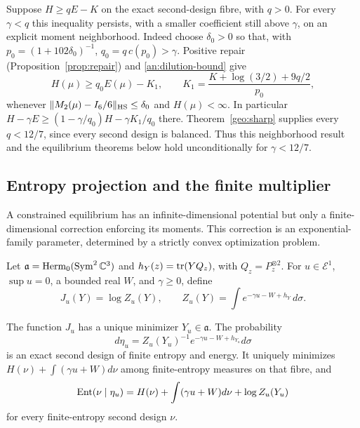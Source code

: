 Suppose $H\ge qE-K$ on the exact second-design fibre, with $q>0$.
For every $\gamma<q$ this inequality persists, with a smaller coefficient
still above $\gamma$, on an explicit moment neighborhood. Indeed choose
$\delta_0>0$ so that, with $p_0=(1+102\delta_0)^{-1}$,
$q_0=q\,c(p_0)>\gamma$. Positive repair
(Proposition~\ref{prop:repair}) and \eqref{an:dilution-bound} give
\begin{equation}
 H(\mu)\ge q_0E(\mu)-K_1,
 \qquad
 K_1=\frac{K+\log(3/2)+9q/2}{p_0},
 \label{an:robust-coercivity}
\end{equation}
whenever $\|M_2(\mu)-I_6/6\|_{\rm HS}\le\delta_0$ and $H(\mu)<\infty$.
In particular $H-\gamma E\ge(1-\gamma/q_0)H-\gamma K_1/q_0$ there.
Theorem~\ref{geo:sharp} supplies every $q<12/7$, since every second
design is balanced. Thus this neighborhood result and the equilibrium
theorems below hold unconditionally for $\gamma<12/7$.

\subsection{Entropy projection and the finite multiplier}

A constrained equilibrium has an infinite-dimensional potential but only
a finite-dimensional correction enforcing its moments. This correction
is an exponential-family parameter, determined by a strictly convex
optimization problem.

Let $\mathfrak a=\operatorname{Herm}_0(\operatorname{Sym}^2\mathbb C^3)$ and
$h_Y(z)=\operatorname{tr}(YQ_z)$, with $Q_z=P_z^{\otimes2}$. For
$u\in\mathcal E^1$, $\sup u=0$, a bounded real $W$, and $\gamma\ge0$,
define
\[
 J_u(Y)=\log Z_u(Y),\qquad
 Z_u(Y)=\int e^{-\gamma u-W+h_Y}\,d\sigma.
\]

\begin{theorem}
\label{an:entropy-projection}
The function $J_u$ has a unique minimizer $Y_u\in\mathfrak a$.
The probability
\begin{equation}
 d\eta_u=Z_u(Y_u)^{-1}e^{-\gamma u-W+h_{Y_u}}d\sigma
 \label{an:exponential-family}
\end{equation}
is an exact second design of finite entropy and energy. It uniquely
minimizes $H(\nu)+\int(\gamma u+W)d\nu$ among finite-entropy measures
on that fibre, and
\begin{equation}
 \operatorname{Ent}(\nu\mid\eta_u)
 =H(\nu)+\int(\gamma u+W)d\nu+\log Z_u(Y_u)
 \label{an:pythagoras}
\end{equation}
for every finite-entropy second design $\nu$.
\end{theorem}


